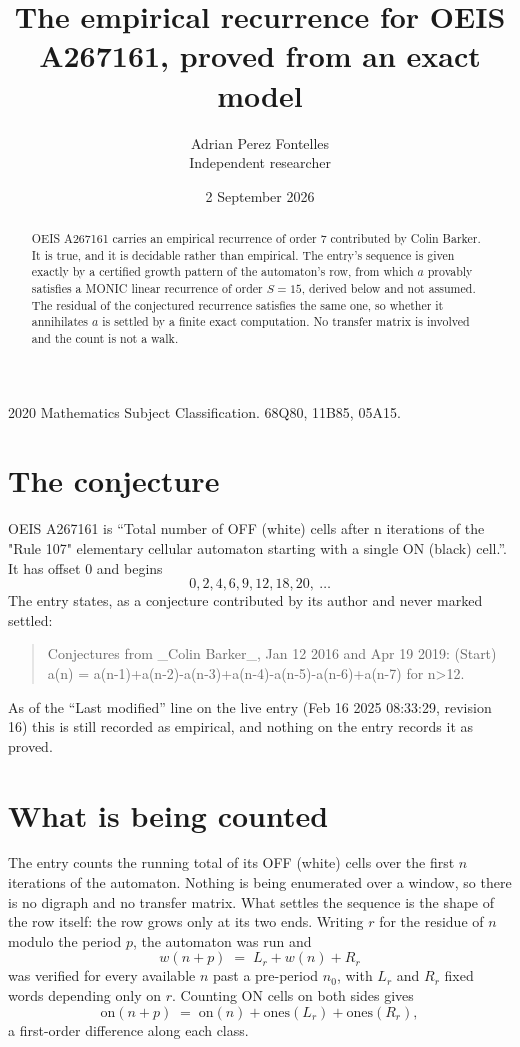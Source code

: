 \documentclass[11pt,a4paper]{article}
\title{The empirical recurrence for OEIS A267161, proved from an exact model}
\author{Adrian Perez Fontelles\\ \small Independent researcher}
\date{2 September 2026}
\theoremstyle{plain}
\theoremstyle{definition}
\begin{document}
\maketitle

\begin{abstract}
OEIS A267161 carries an empirical recurrence of order $7$ contributed by Colin Barker. It is true, and it is
decidable rather than empirical. The entry's sequence is given exactly by a certified growth pattern of the automaton's row, from
which $a$ provably satisfies a MONIC linear recurrence of order $S=15$, derived below and not
assumed. The residual of the conjectured recurrence satisfies the same one, so whether it
annihilates $a$ is settled by a finite exact computation. No transfer matrix is involved and
the count is not a walk.
\end{abstract}

\noindent\small 2020 Mathematics Subject Classification. 68Q80, 11B85, 05A15.\normalsize

\section{The conjecture}

OEIS A267161 is ``Total number of OFF (white) cells after n iterations of the "Rule 107" elementary cellular automaton starting with a single ON (black) cell.''. It has offset $0$ and begins
\[
0, 2, 4, 6, 9, 12, 18, 20,\ \dots
\]
The entry states, as a conjecture contributed by its author and never marked settled:
\begin{quote}
Conjectures from \_Colin Barker\_, Jan 12 2016 and Apr 19 2019: (Start) a(n) = a(n-1)+a(n-2)-a(n-3)+a(n-4)-a(n-5)-a(n-6)+a(n-7) for n>12.
\end{quote}
As of the ``Last modified'' line on the live entry (Feb 16 2025 08:33:29, revision 16)
this is still recorded as empirical, and nothing on the entry records it as proved.

\section{What is being counted}

The entry counts the running total of its OFF (white) cells over the first $n$ iterations of the automaton. Nothing is being enumerated over a window, so there is
no digraph and no transfer matrix. What settles the sequence is the shape of the row itself:
the row grows only at its two ends. Writing
$r$ for the residue of $n$ modulo the period $p$, the automaton was run and
\[
w(n+p)\;=\;L_r + w(n) + R_r
\]
was verified for every available $n$ past a
pre-period $n_0$, with $L_r$ and $R_r$ fixed words depending only on $r$. Counting ON cells on
both sides gives
\[
\mathrm{on}(n+p)\;=\;\mathrm{on}(n)+\mathrm{ones}(L_r)+\mathrm{ones}(R_r),
\]
a first-order difference along each class.
\end{document}
